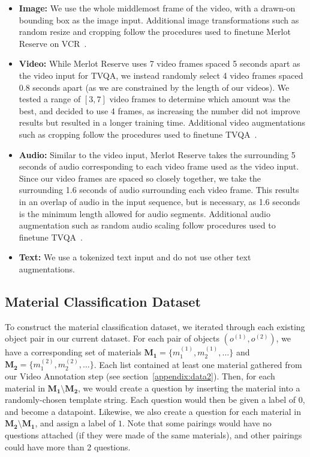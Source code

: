 \documentclass[runningheads]{llncs}
\begin{document}
\begin{itemize}
    \item \textbf{Image:} We use the whole middlemost frame of the video, with a drawn-on bounding box as the image input. Additional image transformations such as random resize and cropping follow the procedures used to finetune Merlot Reserve on VCR~\cite{zellers2022merlotreserve}. 
    \item \textbf{Video:} While Merlot Reserve uses 7 video frames spaced 5 seconds apart as the video input for TVQA, we instead randomly select 4 video frames spaced 0.8 seconds apart (as we are constrained by the length of our videos). We tested a range of $[3, 7]$ video frames to determine which amount was the best, and decided to use 4 frames, as increasing the number did not improve results but resulted in a longer training time. Additional video augmentations such as cropping follow the procedures used to finetune TVQA~\cite{zellers2022merlotreserve}. 
    \item \textbf{Audio:} Similar to the video input, Merlot Reserve takes the surrounding 5 seconds of audio corresponding to each video frame used as the video input. Since our video frames are spaced so closely together, we take the surrounding 1.6 seconds of audio surrounding each video frame. This results in an overlap of audio in the input sequence, but is necessary, as 1.6 seconds is the minimum length allowed for audio segments. Additional audio augmentation such as random audio scaling follow procedures used to finetune TVQA~\cite{zellers2022merlotreserve}.  
    \item \textbf{Text:} We use a tokenized text input and do not use other text augmentations.
\end{itemize}

\subsection{Material Classification Dataset}

To construct the material classification dataset, we iterated through each existing object pair in our current dataset. For each pair of objects $(o^{(1)}, o^{(2)})$, we have a corresponding set of materials $\mathbf{M_1} = \{m_1^{(1)}, m_2^{(1)}, \dots \}$ and $\mathbf{M_2} = \{m_1^{(2)}, m_2^{(2)}, \dots \}$. Each list contained at least one material gathered from our Video Annotation step (see section~\ref{appendix:data2}). Then, for each material in $\mathbf{M_1} \setminus \mathbf{M_2}$, we would create a question by inserting the material into a randomly-chosen template string. Each question would then be given a label of $0$, and become a datapoint. Likewise, we also create a question for each material in $\mathbf{M_2} \setminus \mathbf{M_1}$, and assign a label of $1$. Note that some pairings would have no questions attached (if they were made of the same materials), and other pairings could have more than 2 questions. 
\end{document}
